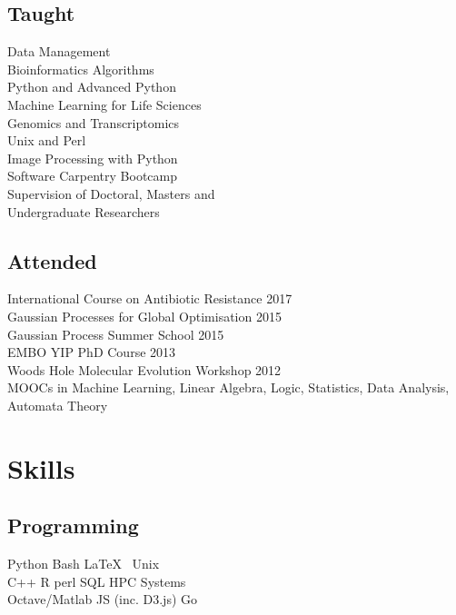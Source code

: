 \documentclass[]{Finlay_Maguire_CV}
\begin{document}
\begin{minipage}[t]{0.33\textwidth}
\subsection{Taught}
Data Management\\
Bioinformatics Algorithms\\
Python and Advanced Python\\
Machine Learning for Life Sciences\\
Genomics and Transcriptomics\\
Unix and Perl\\
Image Processing with Python\\
Software Carpentry Bootcamp\\
Supervision of Doctoral, Masters and \\ Undergraduate Researchers\\
\sectionsep

\subsection{Attended}
International Course on Antibiotic Resistance 2017 \\
Gaussian Processes for Global Optimisation 2015\\
Gaussian Process Summer School 2015\\
EMBO YIP PhD Course 2013\\
Woods Hole Molecular Evolution Workshop 2012\\
MOOCs in Machine Learning, Linear Algebra, 
Logic, Statistics, Data Analysis, Automata Theory\\
\sectionsep


\section{Skills}
\subsection{Programming}
    \textit{}
    Python \textbullet{} Bash \textbullet{}  \LaTeX\ \textbullet{} Unix\\
    \textit{}
    C++ \textbullet{} R \textbullet{} perl \textbullet{} SQL \textbullet{} HPC Systems\\
    \textit{}
    Octave/Matlab \textbullet{} JS (inc. D3.js) \textbullet{} Go\\
\sectionsep

\end{minipage}
\end{document}
